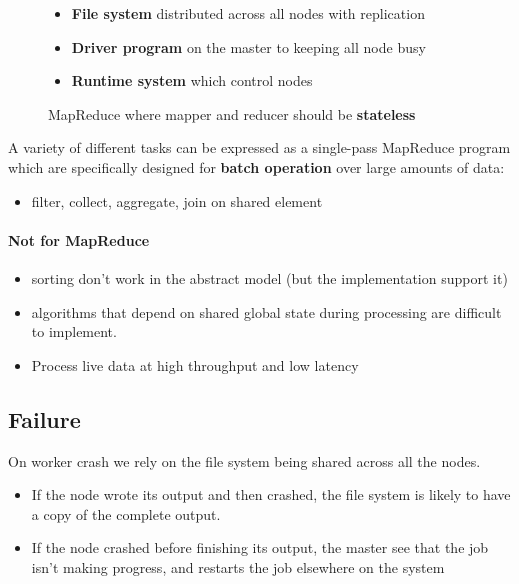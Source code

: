 \begin{figure}[!h]
\begin{tikzpicture}[node distance=2cm]
    \end{tikzpicture}

    \centering
    \begin{itemize}
        \item \textbf{File system} distributed across all nodes with replication
        \item \textbf{Driver program} on the master to keeping all node busy
        \item \textbf{Runtime system} which control nodes
    \end{itemize}
    \caption{MapReduce where mapper and reducer should be \textbf{stateless}
    }
\end{figure}


A variety of different tasks can be expressed 
as a single-­pass MapReduce program which are specifically designed
for \textbf{batch operation} over large amounts of data:
\begin{itemize}
    \item filter, collect, aggregate, join on shared element
\end{itemize}

\paragraph{Not for MapReduce}
\begin{itemize}
    \item sorting don't work in the abstract model (but the
        implementation support it)
    \item algorithms that depend on shared global state during 
        processing are difficult to implement.
    \item Process live data at high throughput and low latency

\end{itemize}


\subsection{Failure}
On worker crash we rely on the file system being shared 
across all the nodes. 
\begin{itemize}
    \item If the node wrote its output and then crashed, 
        the file system is likely to have a copy of the complete output.
    \item If the node crashed before finishing its output, the master 
        see that the job isn’t making progress, and restarts the 
        job elsewhere on the system
\end{itemize}

